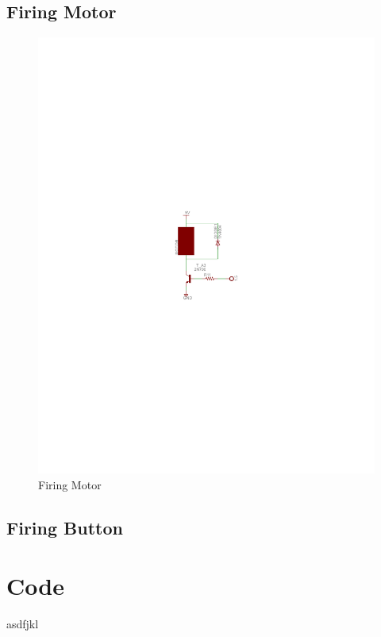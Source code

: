 \documentclass[a4paper, 11pt]{article}
\begin{document}
	\subsection{Firing Motor}
	\begin{figure}[!ht]
		\centering
		\vspace{-11cm}
		\includegraphics{report-images/firing-motor}
		\vspace{-11.5cm}
		\caption{Firing Motor}
	\end{figure}
\newpage
	\subsection{Firing Button}
\newpage
\section{Code}
asdfjkl
\end{document}
